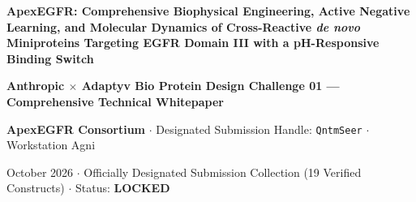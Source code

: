 \documentclass[11pt]{article}
\begin{document}
\begin{center}
  {\LARGE \textbf{\color{navyblue} ApexEGFR: Comprehensive Biophysical Engineering, Active Negative Learning, and Molecular Dynamics of Cross-Reactive \textit{de novo} Miniproteins Targeting EGFR Domain III with a pH-Responsive Binding Switch}}\par
  \vspace{0.6em}
  {\large \textbf{Anthropic $\times$ Adaptyv Bio Protein Design Challenge 01 --- Comprehensive Technical Whitepaper}}\par
  \vspace{0.4em}
  {\normalsize \textbf{ApexEGFR Consortium} $\cdot$ Designated Submission Handle: \texttt{QntmSeer} $\cdot$ Workstation Agni}\par
  \vspace{0.2em}
  {\small October 2026 $\cdot$ Officially Designated Submission Collection (19 Verified Constructs) $\cdot$ Status: \textbf{LOCKED}}\par
\end{center}
\end{document}
